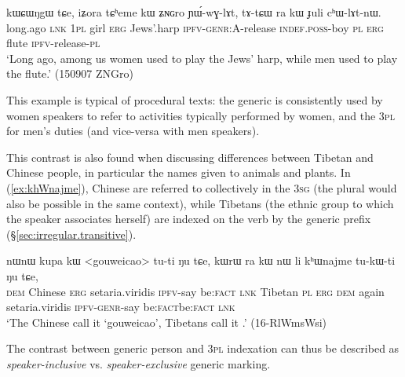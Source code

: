 \begin{exe}
\ex \label{ex:Juli.chWlAtnW}
\gll kɯɕɯŋgɯ tɕe, iʑora tɕʰeme kɯ ʑɴɢro ɲɯ́-wɣ-lɤt, tɤ-tɕɯ ra kɯ ɟuli cʰɯ-lɤt-nɯ. \\
 long.ago \textsc{lnk} \textsc{1pl} girl  \textsc{erg} Jews'.harp \textsc{ipfv}-\textsc{genr}:\textsc{A}-release \textsc{indef}.\textsc{poss}-boy \textsc{pl} \textsc{erg} flute \textsc{ipfv}-release-\textsc{pl}  \\
 \glt `Long ago, among us women used to play the Jews' harp, while men used to play the flute.' (150907 ZNGro)
\end{exe}
 
This example is typical of procedural texts: the generic is consistently used by women speakers to refer to activities typically performed by women, and the \textsc{3pl} for men's duties (and vice-versa with men speakers). 

This contrast is also found when discussing differences between Tibetan and Chinese people, in particular the names given to animals and plants. In (\ref{ex:khWnajme}), Chinese are referred to collectively in the \textsc{3sg} (the plural would also be possible in the same context), while Tibetans (the ethnic group to which the speaker associates herself) are indexed on the verb by the generic  prefix (§\ref{sec:irregular.transitive}).

\begin{exe}
\ex \label{ex:khWnajme}
\gll nɯnɯ kupa kɯ <gouweicao> tu-ti ŋu tɕe, kɯrɯ ra kɯ nɯ li kʰɯnajme tu-kɯ-ti ŋu tɕe, \\
\textsc{dem} Chinese \textsc{erg} setaria.viridis \textsc{ipfv}-say be:\textsc{fact} \textsc{lnk}  Tibetan \textsc{pl} \textsc{erg} \textsc{dem} again setaria.viridis \textsc{ipfv}-\textsc{genr}-say be:\textsc{fact}be:\textsc{fact} \textsc{lnk}  \\
\glt `The Chinese call it `gouweicao', Tibetans call it .' (16-RlWmsWsi)
\end{exe}

The contrast between  generic person and \textsc{3pl} indexation can thus be described as \textit{speaker-inclusive} vs. \textit{speaker-exclusive} generic marking.

